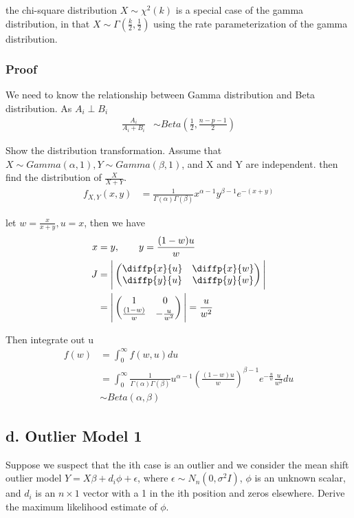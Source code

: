 \documentclass[11pt]{article} %
\begin{document}
the chi-square distribution $X \sim \chi^2(k)$ is a special case of the gamma distribution, in that $X \sim \Gamma(\frac{k}{2}, \frac{1}{2})$ using the rate parameterization of the gamma distribution.


\subsubsection{Proof}
We need to know the relationship between Gamma distribution and Beta distribution.
As $A_i \perp B_i$
\begin{align*}
	\frac{A_i}{A_i + B_i} & \sim Beta (\frac{1}{2} , \frac{n-p-1}{2}) 
\end{align*} 

Show the distribution transformation. Assume that $X \sim Gamma(\alpha, 1), Y \sim Gamma(\beta, 1)$, and X and Y are independent. then find the distribution of $\frac{X}{X+Y}$.
\begin{align*}
	f_{X,Y}(x, y) & =  \frac{1}{\Gamma(\alpha) \Gamma(\beta)} x^{\alpha-1} y^{\beta -1} e^{-(x+y)}
\end{align*} 

let $w= \frac{x}{x+y}, u= x$, then we have
\begin{align*}
	x & =  y, \qquad y= \frac{(1-w)u}{w} \\
	J &= \Bigg | \begin{pmatrix} 
	\diffp{x}{u} & \diffp{x}{w} \\
	\diffp{y}{u} & \diffp{y}{w} 
	\end{pmatrix}
	\Bigg | \\
	&=  \Bigg | \begin{pmatrix} 
		1 & 0\\
		\frac{(1-w)}{w} & -\frac{u}{w^2} 
	\end{pmatrix}
	\Bigg |  = \frac{u}{w^2}
\end{align*} 

Then integrate out u
\begin{align*}
	f(w) & = \int_{0}^{\infty} f(w,u) du \\
	& =  \int_{0}^{\infty}  \frac{1}{\Gamma(\alpha) \Gamma(\beta)} u^{\alpha-1} (\frac{(1-w)u}{w})^{\beta -1} e^{-\frac{u}{w}} \frac{u}{w^2} du \\
	& \sim Beta(\alpha, \beta)
\end{align*} 



\subsection{d. Outlier Model 1}
Suppose we suspect that the ith case is an outlier and we consider the mean shift outlier model
$Y= X \beta + d_i \phi + \epsilon$, where $\epsilon \sim N_n(0, \sigma^2 I)$, $\phi$ is an unknown scalar, and $d_i$ is an $n \times 1$ vector with a 1 in the ith position and zeros elsewhere.
Derive the maximum likelihood estimate of $\phi$.
\end{document}
